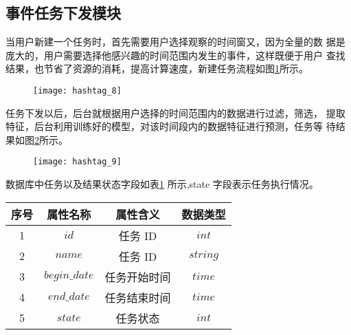 \subsection{事件任务下发模块}
当用户新建一个任务时，首先需要用户选择观察的时间窗又，因为全量的数 据是庞大的，用户需要选择他感兴趣的时间范围内发生的事件，这样既便于用户 查找结果，也节省了资源的消耗，提高计算速度，新建任务流程如图\ref{fig:5_4}所示。


\begin{figure}[!htbp]
    \centering
    \texttt{[image: hashtag\_8]}
    \label{fig:5_4}
\end{figure}


任务下发以后，后台就根据用户选择的时间范围内的数据进行过滤，筛选， 提取特征，后台利用训练好的模型，对该时间段内的数据特征进行预测，任务等 待结果如图\ref{fig:5_5}所示。

\begin{figure}[!htbp]
    \centering
    \texttt{[image: hashtag\_9]}
    \label{fig:5_5}
\end{figure}

数据库中任务以及结果状态字段如表\ref{tab:t52} 所示,state 字段表示任务执行情况。

\begin{table}[H]
    \centering
    \footnotesize%
      \label{tab:t52}
    \setlength{\tabcolsep}{30pt}%
    \renewcommand{\arraystretch}{1.2}%
    \begin{tabular}{cccc}
        \hline
         \textbf{序号} & \textbf{属性名称} & \textbf{属性含义 }& \textbf{数据类型 }  \\
        \hline
         1 & $id$ & 任务 ID & $int$ \\
         2 & $name$ &任务 ID& $string$ \\
         3 & $begin\_date$ & 任务开始时间 & $time$\\
         4 & $end\_date$ &任务结束时间 & $time$ \\
        	5 & $state$ & 任务状态& $int$\\
        	\hline
    \end{tabular}

\end{table}


